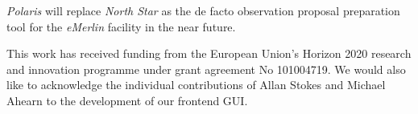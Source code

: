 \documentclass[11pt,twoside]{article}
\begin{document}
\emph{Polaris} will replace \emph{North Star} as the de facto observation proposal preparation tool for
the \emph{eMerlin} facility in the near future.

\acknowledgements This work has received funding from the European Union's Horizon 2020 research and innovation programme under grant agreement No 101004719.
We would also like to acknowledge the individual contributions of Allan Stokes and Michael Ahearn to the development of our frontend GUI\@.


\end{document}
